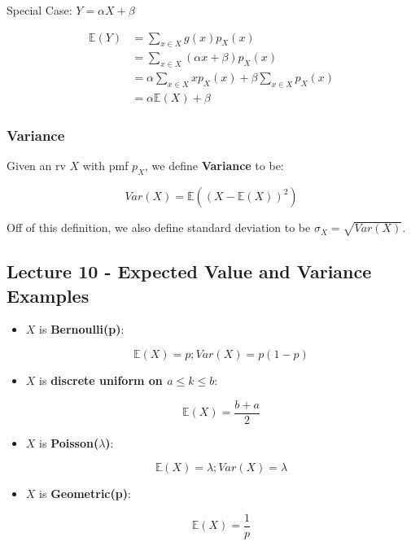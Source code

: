 \documentclass{article}
\begin{document}
Special Case: $Y = \alpha X + \beta$

\[
  \begin{aligned}
    \mathbb{E}(Y)
    &= \sum\limits_{x \in X} g(x) p_X(x) \\
    &= \sum\limits_{x \in X} (\alpha x + \beta) p_X(x) \\
    &= \alpha \sum\limits_{x \in X} x p_X(x) + \beta \sum\limits_{x
      \in X} p_X(x) \\
    &= \alpha \mathbb{E}(X) + \beta
    
  \end{aligned}
\]

\subsubsection{Variance}

Given an rv $X$ with pmf $p_X$, we define \textbf{Variance} to be:

\begin{equation}
  \tag{Variance Def}
  \boxed{
    Var(X) = \mathbb{E}((X - \mathbb{E}(X))^2)
  }
\end{equation}

Off of this definition, we also define standard deviation to be
$\sigma_X = \sqrt{Var(X)}$.


\subsection{Lecture 10 - Expected Value and Variance Examples}

\begin{itemize}
\item $X$ is \textbf{Bernoulli(p)}:

  \[
    \mathbb{E}(X) = p; Var(X) = p(1 - p)
  \]

\item $X$ is \textbf{discrete uniform on $a \le k \le b$}:

  \[
    \mathbb{E}(X) = \frac{b + a}{2}
  \]
  
\item $X$ is \textbf{Poisson($\lambda$)}:

  \[
    \mathbb{E}(X) = \lambda; Var(X) = \lambda
  \]

\item $X$ is \textbf{Geometric(p)}:

  \[
    \mathbb{E}(X) = \frac{1}{p}
  \]
\end{itemize}
\end{document}
